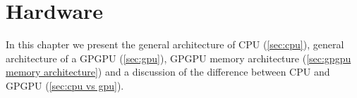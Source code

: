 \chapter{Hardware}
\label{chap:hardware}

In this chapter we present the general architecture of CPU (\cref{sec:cpu}), general architecture of a GPGPU (\cref{sec:gpu}), GPGPU memory architecture (\cref{sec:gpgpu memory architecture}) and a discussion of the difference between CPU and GPGPU (\cref{sec:cpu vs gpu}).





